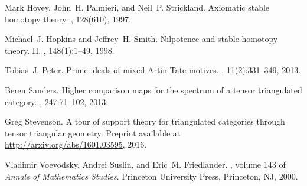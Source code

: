 \documentclass{amsart}
\numberwithin{equation}{section}
\theoremstyle{remark}
\begin{document}
\begin{thebibliography}{FHM03}
Mark Hovey, John~H. Palmieri, and Neil~P. Strickland.
\newblock Axiomatic stable homotopy theory.
, 128(610), 1997.

Michael~J. Hopkins and Jeffrey~H. Smith.
\newblock Nilpotence and stable homotopy theory. {II}.
, 148(1):1--49, 1998.

Tobias~J. Peter.
\newblock Prime ideals of mixed {A}rtin-{T}ate motives.
, 11(2):331--349, 2013.

Beren Sanders.
\newblock Higher comparison maps for the spectrum of a tensor triangulated
  category.
, 247:71--102, 2013.

Greg Stevenson.
\newblock A tour of support theory for triangulated categories through tensor
  triangular geometry.
\newblock Preprint available at \url{http://arxiv.org/abs/1601.03595}, 2016.

Vladimir Voevodsky, Andrei Suslin, and Eric~M. Friedlander.
, volume 143 of
  {\em Annals of Mathematics Studies}.
\newblock Princeton University Press, Princeton, NJ, 2000.

\end{thebibliography}
\end{document}
